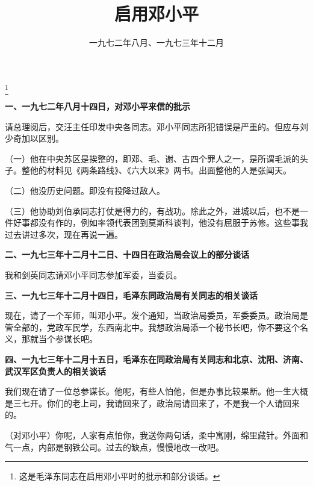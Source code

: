 
\title{启用邓小平}
\date{一九七二年八月、一九七三年十二月}
\thanks{这是毛泽东同志在启用邓小平时的批示和部分谈话。}
\maketitle


\textbf{一、一九七二年八月十四日，对邓小平来信的批示}

请总理阅后，交汪主任印发中央各同志。邓小平同志所犯错误是严重的。但应与刘少奇加以区别。

（一）他在中央苏区是挨整的，即邓、毛、谢、古四个罪人之一，是所谓毛派的头子。整他的材料见《两条路线》、《六大以来》两书。出面整他的人是张闻天。

（二）他没历史问题。即没有投降过敌人。

（三）他协助刘伯承同志打仗是得力的，有战功。除此之外，进城以后，也不是一件好事都没有作的，例如率领代表团到莫斯科谈判，他没有屈服于苏修。这些事我过去讲过多次，现在再说一遍。

\textbf{二、一九七三年十二月十二日、十四日在政治局会议上的部分谈话}

我和剑英同志请邓小平同志参加军委，当委员。

\textbf{三、一九七三年十二月十四日，毛泽东同政治局有关同志的相关谈话}

现在，请了一个军师，叫邓小平。发个通知，当政治局委员，军委委员。政治局是管全部的，党政军民学，东西南北中。我想政治局添一个秘书长吧，你不要这个名义，那就当个参谋长吧。

\textbf{四、一九七三年十二月十五日，毛泽东在同政治局有关同志和北京、沈阳、济南、武汉军区负责人的相关谈话}

我们现在请了一位总参谋长。他呢，有些人怕他，但是办事比较果断。他一生大概是三七开。你们的老上司，我请回来了，政治局请回来了，不是我一个人请回来的。

（对邓小平）你呢，人家有点怕你，我送你两句话，柔中寓刚，绵里藏针。外面和气一点，内部是钢铁公司。过去的缺点，慢慢地改一改吧。

